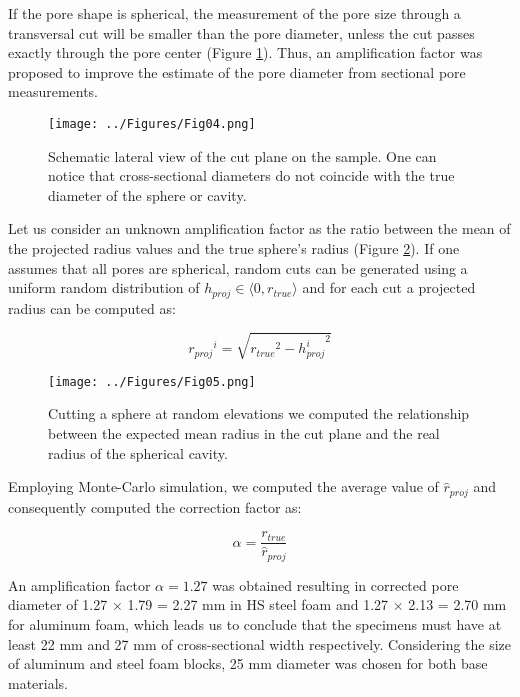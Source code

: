 \documentclass[review]{elsarticle}
\begin{document}
If the pore shape is spherical, the measurement of the pore size through a transversal cut will be smaller than the pore diameter, unless the cut passes exactly through the pore center (Figure \ref{FoamCutPlane}). Thus, an amplification factor was proposed to improve the estimate of the pore diameter from sectional pore measurements.

\begin{figure}[htbp]
	\begin{center}
		\texttt{[image: ../Figures/Fig04.png]}
		\caption{Schematic lateral view of the cut plane on the sample. One can notice that cross-sectional diameters do not coincide with the true diameter of the sphere or cavity.}
		\label{FoamCutPlane}
	\end{center}
\end{figure}


Let us consider an unknown amplification factor as the ratio between the mean of the projected radius values and the true sphere’s radius (Figure \ref{RandomPlaneCut}). If one assumes that all pores are spherical, random cuts can be generated using a uniform random distribution of $h_{proj} \in \langle 0,r_{true} \rangle$ and for each cut a projected radius can be computed as:

\begin{equation}\label{Eq11}
{r_{proj}}^i=\sqrt{{r_{true}}^2-{h_{proj}^i}^2}
\end{equation}

\begin{figure}[htbp]
	\begin{center}
		\texttt{[image: ../Figures/Fig05.png]}
		\caption{Cutting a sphere at random elevations we computed the relationship between the expected mean radius in the cut plane and the real radius of the spherical cavity.}
		\label{RandomPlaneCut}
	\end{center}
\end{figure}

Employing Monte-Carlo simulation, we computed the average value of $\hat{r}_{proj}$  and consequently computed the correction factor as:

\begin{equation}\label{Eq12}
\alpha=\frac{r_{true}}{\hat{r}_{proj}}
\end{equation}

An amplification factor $\alpha=1.27$ was obtained resulting in corrected pore diameter of 1.27 $\times$ 1.79 = 2.27 mm in HS steel foam and 1.27 $\times$ 2.13 = 2.70 mm for aluminum foam, which leads us to conclude that the specimens must have at least 22 mm and 27 mm of cross-sectional width respectively. Considering the size of aluminum and steel foam blocks, 25 mm diameter was chosen for both base materials.
\end{document}
